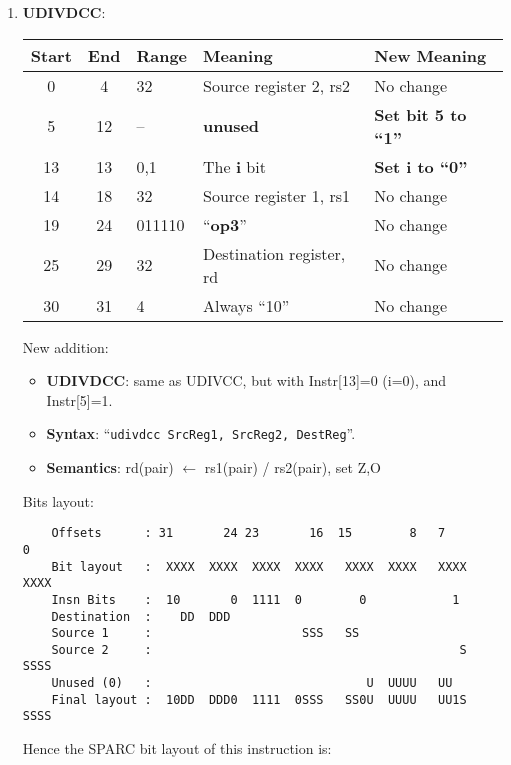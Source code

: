 \begin{enumerate}
\item \textbf{UDIVDCC}:\\
  \begin{center}
    \begin{tabular}[p]{|c|c|l|l|l|}
      \hline
      \textbf{Start} & \textbf{End} & \textbf{Range} & \textbf{Meaning} &
                                                                          \textbf{New Meaning}\\
      \hline
      0 & 4 & 32 & Source register 2, rs2 & No change \\
      5 & 12 & -- & \textbf{unused} & \textbf{Set bit 5 to ``1''} \\
      13 & 13 & 0,1 & The \textbf{i} bit & \textbf{Set i to ``0''} \\
      14 & 18 & 32 & Source register 1, rs1 & No change \\
      19 & 24 & 011110 & ``\textbf{op3}'' & No change \\
      25 & 29 & 32 & Destination register, rd & No change \\
      30 & 31 & 4 & Always ``10'' & No change \\
      \hline
    \end{tabular}
  \end{center}
  New addition:
  \begin{itemize}
  \item []\textbf{UDIVDCC}: same as UDIVCC, but with Instr[13]=0 (i=0), and
    Instr[5]=1.
  \item []\textbf{Syntax}: ``\texttt{udivdcc  SrcReg1, SrcReg2, DestReg}''.
  \item []\textbf{Semantics}: rd(pair) $\leftarrow$ rs1(pair) / rs2(pair), set Z,O
  \end{itemize}
  Bits layout:
\begin{verbatim}
    Offsets      : 31       24 23       16  15        8   7        0
    Bit layout   :  XXXX  XXXX  XXXX  XXXX   XXXX  XXXX   XXXX  XXXX
    Insn Bits    :  10       0  1111  0        0            1       
    Destination  :    DD  DDD                                       
    Source 1     :                     SSS   SS
    Source 2     :                                           S  SSSS
    Unused (0)   :                              U  UUUU   UU        
    Final layout :  10DD  DDD0  1111  0SSS   SS0U  UUUU   UU1S  SSSS
\end{verbatim}

  Hence the SPARC bit layout of this instruction is:


\end{enumerate}
